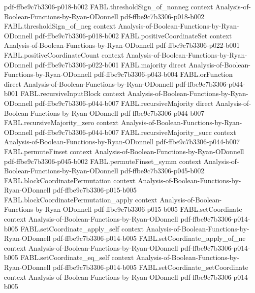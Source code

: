 \begin{theorem}
  {pdf-ffbe9c7b3306-p018-b002}
\proofstep
  {FABL.thresholdSign_of_nonneg}
  {context}
  {Analysis-of-Boolean-Functions-by-Ryan-ODonnell}
  {pdf-ffbe9c7b3306-p018-b002}
\proofstep
  {FABL.thresholdSign_of_neg}
  {context}
  {Analysis-of-Boolean-Functions-by-Ryan-ODonnell}
  {pdf-ffbe9c7b3306-p018-b002}
\proofstep
  {FABL.positiveCoordinateSet}
  {context}
  {Analysis-of-Boolean-Functions-by-Ryan-ODonnell}
  {pdf-ffbe9c7b3306-p022-b001}
\proofstep
  {FABL.positiveCoordinateCount}
  {context}
  {Analysis-of-Boolean-Functions-by-Ryan-ODonnell}
  {pdf-ffbe9c7b3306-p022-b001}
\proofstep
  {FABL.majority}
  {direct}
  {Analysis-of-Boolean-Functions-by-Ryan-ODonnell}
  {pdf-ffbe9c7b3306-p043-b004}
\proofstep
  {FABL.orFunction}
  {direct}
  {Analysis-of-Boolean-Functions-by-Ryan-ODonnell}
  {pdf-ffbe9c7b3306-p044-b001}
\proofstep
  {FABL.recursiveInputBlock}
  {context}
  {Analysis-of-Boolean-Functions-by-Ryan-ODonnell}
  {pdf-ffbe9c7b3306-p044-b007}
\proofstep
  {FABL.recursiveMajority}
  {direct}
  {Analysis-of-Boolean-Functions-by-Ryan-ODonnell}
  {pdf-ffbe9c7b3306-p044-b007}
\proofstep
  {FABL.recursiveMajority_zero}
  {context}
  {Analysis-of-Boolean-Functions-by-Ryan-ODonnell}
  {pdf-ffbe9c7b3306-p044-b007}
\proofstep
  {FABL.recursiveMajority_succ}
  {context}
  {Analysis-of-Boolean-Functions-by-Ryan-ODonnell}
  {pdf-ffbe9c7b3306-p044-b007}
\proofstep
  {FABL.permuteFinset}
  {context}
  {Analysis-of-Boolean-Functions-by-Ryan-ODonnell}
  {pdf-ffbe9c7b3306-p045-b002}
\proofstep
  {FABL.permuteFinset_symm}
  {context}
  {Analysis-of-Boolean-Functions-by-Ryan-ODonnell}
  {pdf-ffbe9c7b3306-p045-b002}
\proofstep
  {FABL.blockCoordinatePermutation}
  {context}
  {Analysis-of-Boolean-Functions-by-Ryan-ODonnell}
  {pdf-ffbe9c7b3306-p015-b005}
\proofstep
  {FABL.blockCoordinatePermutation_apply}
  {context}
  {Analysis-of-Boolean-Functions-by-Ryan-ODonnell}
  {pdf-ffbe9c7b3306-p015-b005}
\proofstep
  {FABL.setCoordinate}
  {context}
  {Analysis-of-Boolean-Functions-by-Ryan-ODonnell}
  {pdf-ffbe9c7b3306-p014-b005}
\proofstep
  {FABL.setCoordinate_apply_self}
  {context}
  {Analysis-of-Boolean-Functions-by-Ryan-ODonnell}
  {pdf-ffbe9c7b3306-p014-b005}
\proofstep
  {FABL.setCoordinate_apply_of_ne}
  {context}
  {Analysis-of-Boolean-Functions-by-Ryan-ODonnell}
  {pdf-ffbe9c7b3306-p014-b005}
\proofstep
  {FABL.setCoordinate_eq_self}
  {context}
  {Analysis-of-Boolean-Functions-by-Ryan-ODonnell}
  {pdf-ffbe9c7b3306-p014-b005}
\proofstep
  {FABL.setCoordinate_setCoordinate}
  {context}
  {Analysis-of-Boolean-Functions-by-Ryan-ODonnell}
  {pdf-ffbe9c7b3306-p014-b005}
\proofstep

\end{theorem}
